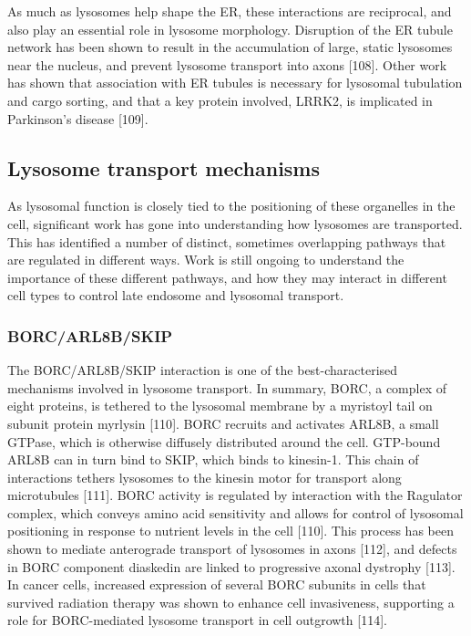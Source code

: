 \documentclass[
  12pt,
  a4paper,
]{book}
\begin{document}
As much as lysosomes help shape the ER, these interactions are reciprocal, and also play an essential role in lysosome morphology. Disruption of the ER tubule network has been shown to result in the accumulation of large, static lysosomes near the nucleus, and prevent lysosome transport into axons {[}108{]}. Other work has shown that association with ER tubules is necessary for lysosomal tubulation and cargo sorting, and that a key protein involved, LRRK2, is implicated in Parkinson's disease {[}109{]}.

\hypertarget{lysosome-transport-mechanisms}{%
\subsection{Lysosome transport mechanisms}\label{lysosome-transport-mechanisms}}

As lysosomal function is closely tied to the positioning of these organelles in the cell, significant work has gone into understanding how lysosomes are transported. This has identified a number of distinct, sometimes overlapping pathways that are regulated in different ways. Work is still ongoing to understand the importance of these different pathways, and how they may interact in different cell types to control late endosome and lysosomal transport.

\hypertarget{borcarl8bskip}{%
\subsubsection{BORC/ARL8B/SKIP}\label{borcarl8bskip}}

The BORC/ARL8B/SKIP interaction is one of the best-characterised mechanisms involved in lysosome transport. In summary, BORC, a complex of eight proteins, is tethered to the lysosomal membrane by a myristoyl tail on subunit protein myrlysin {[}110{]}. BORC recruits and activates ARL8B, a small GTPase, which is otherwise diffusely distributed around the cell. GTP-bound ARL8B can in turn bind to SKIP, which binds to kinesin-1. This chain of interactions tethers lysosomes to the kinesin motor for transport along microtubules {[}111{]}. BORC activity is regulated by interaction with the Ragulator complex, which conveys amino acid sensitivity and allows for control of lysosomal positioning in response to nutrient levels in the cell {[}110{]}. This process has been shown to mediate anterograde transport of lysosomes in axons {[}112{]}, and defects in BORC component diaskedin are linked to progressive axonal dystrophy {[}113{]}. In cancer cells, increased expression of several BORC subunits in cells that survived radiation therapy was shown to enhance cell invasiveness, supporting a role for BORC-mediated lysosome transport in cell outgrowth {[}114{]}.
\end{document}
